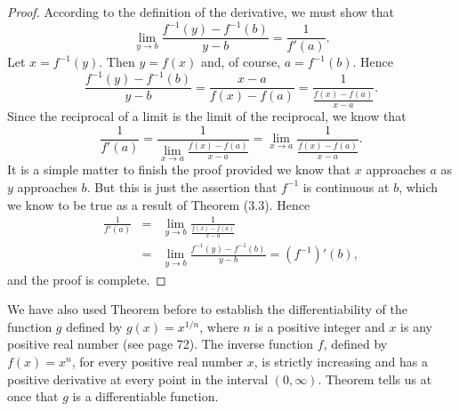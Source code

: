 \begin{proof}
According to the definition of the derivative, we must show that
$$
\lim_{y \rightarrow b} \frac{ f^{-1}(y) - f^{-1}(b)}{y - b} =\frac{1}{f'(a)}.  
$$
Let $x = f^{-1}(y)$. Then $y = f(x)$ and, of course, $a = f^{-1}(b)$. Hence
$$
\frac{f^{-1}(y) - f^{-1}(b)}{y - b} = \frac{x - a}{f(x) - f(a)} = \frac{1}{\frac{f(x) - f(a)}{x-a}}.
$$
Since the reciprocal of a limit is the limit of the reciprocal, we know that 
$$
\frac{1}{f'(a)} = \frac{1}{\lim_{x \rightarrow a} \frac{f(x)-f(a)}{x-a}} = \lim_{x \rightarrow a} \frac{1}{\frac{ f(x)-f(a)} {x-a}}.
$$
It is a simple matter to finish the proof provided we know that $x$ approaches $a$ as $y$ approaches $b$. But this is just the assertion that $f^{-1}$ is continuous at $b$, which we know to be true
as a result of Theorem (3.3).  Hence
\begin{eqnarray*}
\frac{1}{f'(a)} &=& \lim_{y \rightarrow b} \frac{1}{ \frac{f(x) - f(a)}{ x-a}}\\
                     &=& \lim_{y \rightarrow b} \frac {f^{-1}(y) - f^{-1}(b)}{y - b} = (f^{-1})'(b),
\end{eqnarray*}
and the proof is complete.
\end{proof}

We have also used Theorem  before to establish the differentiability of the function $g$ defined by $g(x) = x^{1/n}$, where $n$ is a positive integer and $x$ is any positive real number (see
page 72). The inverse function $f$, defined by $f(x) = x^n$, for every positive real number $x$, is strictly increasing and has a positive derivative at every point in the interval $(0, \infty)$.
Theorem  tells us at once that $g$ is a differentiable function.
